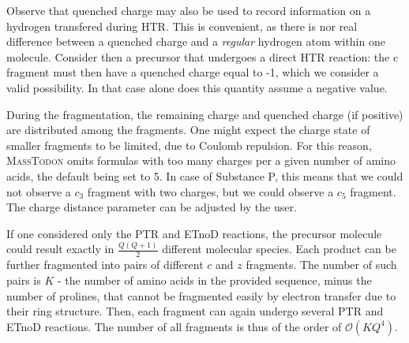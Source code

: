 \documentclass[journal=ancham, manuscript=article, layout=twocolumn]{achemso}
\begin{document}
Observe that quenched charge may also be used to record information on a hydrogen transfered during HTR.
This is convenient, as there is nor real difference between a quenched charge and a \textit{regular} hydrogen atom within one molecule.
Consider then a precursor that undergoes a direct HTR reaction: the c fragment must then have a quenched charge equal to -1, which we consider a valid possibility. 
In that case alone does this quantity assume a negative value.

During the fragmentation, the remaining charge and quenched charge (if positive) are distributed among the fragments. 
One might expect the charge state of smaller fragments to be limited, due to Coulomb repulsion.
For this reason, \textsc{MassTodon} omits formulas with too many charges per a given number of amino acids, the default being set to 5. 
In case of Substance P, this means that we could not observe a $c_{3}$ fragment with two charges, but we could observe a $c_5$ fragment.
The charge distance parameter can be adjusted by the user.

If one considered only the PTR and ETnoD reactions, the precursor molecule could result exactly in $\frac{Q(Q+1)}{2}$ different molecular species. 
Each product can be further fragmented into pairs of different $c$ and $z$ fragments. 
The number of such pairs is $K$ - the number of amino acids in the provided sequence, minus the number of prolines, that cannot be fragmented easily by electron transfer due to their ring structure. 
Then, each fragment can again undergo several PTR and ETnoD reactions. 
The number of all fragments is thus of the order of $\mathcal{O}(K Q^4)$. 
\end{document}
